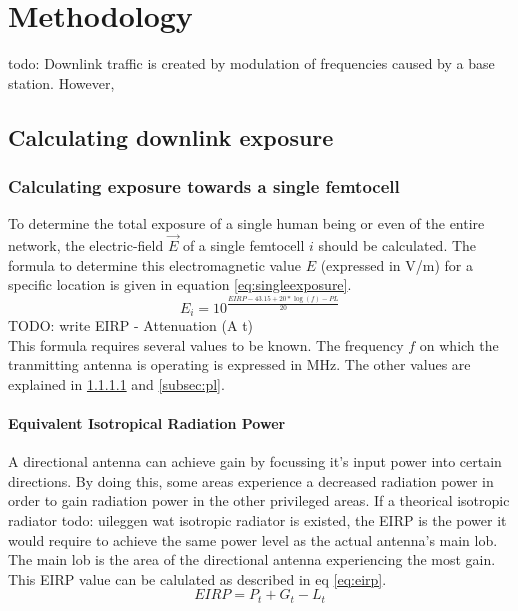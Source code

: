 \chapter{Methodology}
\label{chap:deploymenttool}
todo: Downlink traffic is created by modulation of frequencies caused by a base station. However, 
 
\section{Calculating downlink exposure}
\subsection{Calculating exposure towards a single femtocell}
\label{sec:calculatingexposure}
To determine the total exposure of a single human being or even of the entire network, the electric-field $\vec{E}$ of a single femtocell $i$ should be calculated.
The formula to determine this electromagnetic value $E$ (expressed in V/m) for a specific location is given in equation \ref{eq:singleexposure}.
\begin{equation}
E_i = 10^{\frac{EIRP - 43.15 + 20*\log(f)- PL}{20}}
\label{eq:singleexposure}
\end{equation}
TODO: write EIRP - Attenuation (A t)\\
This formula requires several values to be known. The frequency $f$ on which the tranmitting antenna is operating is expressed in MHz. The other values are explained in \ref{subsec:eirp} and \ref{subsec:pl}.

\subsubsection{Equivalent Isotropical Radiation Power}
\label{subsec:eirp}

A directional antenna can achieve gain by focussing it's input power into certain directions. By doing this, some areas experience a decreased radiation power in order to gain radiation power 
in the other privileged areas. If a theorical isotropic radiator \color{red}todo: uileggen wat isotropic radiator is\color{black} existed, the \gls{EIRP} is the power it would require to achieve the same power level as the actual antenna's main lob. The main lob is the area of the directional antenna experiencing the most gain.
This \gls{EIRP} value can be calulated as described in eq \ref{eq:eirp}.
\begin{equation}
EIRP = P_t + G_t - L_t
\label{eq:eirp}
\end{equation}

